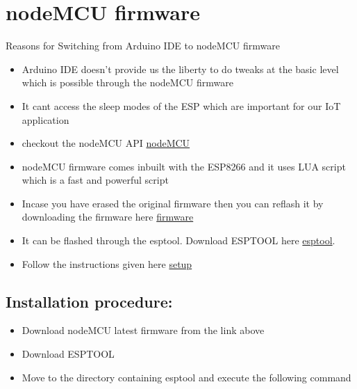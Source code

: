 \documentclass[16pt]{article}
\begin{document}
\vspace{19cm}
\section{nodeMCU firmware}
\vspace{0.5cm}

Reasons for Switching from Arduino IDE to nodeMCU firmware

\begin{itemize}

\item
  Arduino IDE doesn't provide us the liberty to do tweaks at the basic
  level which is possible through the nodeMCU firmware
\item
  It cant access the sleep modes of the ESP which are important for our
  IoT application
\item
  checkout the nodeMCU API
  \href{https://github.com/nodemcu/nodemcu-firmware/wiki/nodemcu_api_en}{nodeMCU}
\item
  nodeMCU firmware comes inbuilt with the ESP8266 and it uses LUA script
  which is a fast and powerful script
\item
  Incase you have erased the original firmware then you can reflash it
  by downloading the firmware here
  \href{https://github.com/nodemcu/nodemcu-firmware/raw/master/pre_build/latest/nodemcu_latest.bin}{firmware}
\item
  It can be flashed through the esptool. Download ESPTOOL here
  \href{https://github.com/themadinventor/esptool/}{esptool}.
\item
  Follow the instructions given here
  \href{http://www.whatimade.today/flashing-the-nodemcu-firmware-on-the-esp8266-linux-guide/}{setup}
 
\end{itemize}

\subsection{Installation procedure:}

\begin{itemize}

\item
  Download nodeMCU latest firmware from the link above 
\item
  Download ESPTOOL
\item
  Move to the directory containing esptool and execute the following
  command
\end{itemize}
\end{document}
